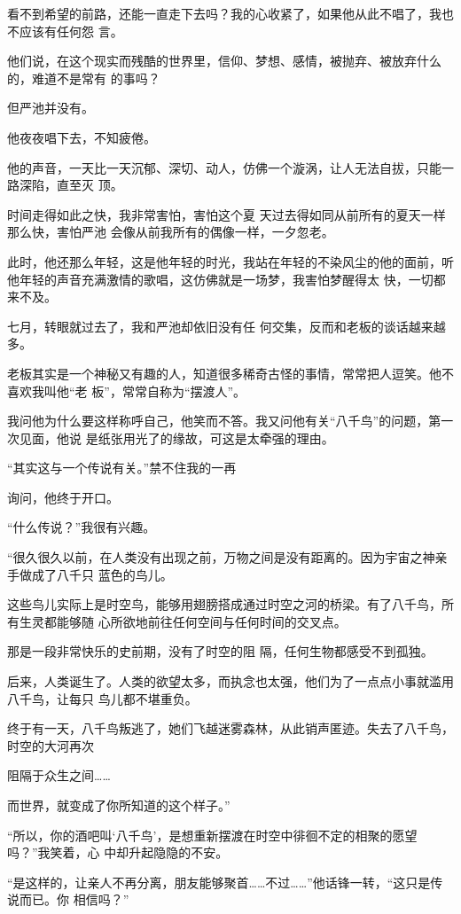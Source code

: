 \documentclass{article}
\begin{document}
看不到希望的前路，还能一直走下去吗？我的心收紧了，如果他从此不唱了，我也不应该有任何怨
言。 

他们说，在这个现实而残酷的世界里，信仰、梦想、感情，被抛弃、被放弃什么的，难道不是常有
的事吗？ 


但严池并没有。 


他夜夜唱下去，不知疲倦。 

他的声音，一天比一天沉郁、深切、动人，仿佛一个漩涡，让人无法自拔，只能一路深陷，直至灭
顶。 

时间走得如此之快，我非常害怕，害怕这个夏
\newpage
天过去得如同从前所有的夏天一样那么快，害怕严池
会像从前我所有的偶像一样，一夕忽老。 

此时，他还那么年轻，这是他年轻的时光，我站在年轻的不染风尘的他的面前，听他年轻的声音充满激情的歌唱，这仿佛就是一场梦，我害怕梦醒得太
快，一切都来不及。 

七月，转眼就过去了，我和严池却依旧没有任
何交集，反而和老板的谈话越来越多。 

老板其实是一个神秘又有趣的人，知道很多稀奇古怪的事情，常常把人逗笑。他不喜欢我叫他“老
板”，常常自称为“摆渡人”。 

我问他为什么要这样称呼自己，他笑而不答。我又问他有关“八千鸟”的问题，第一次见面，他说
是纸张用光了的缘故，可这是太牵强的理由。 

“其实这与一个传说有关。”禁不住我的一再

\newpage
询问，他终于开口。 


“什么传说？”我很有兴趣。 

“很久很久以前，在人类没有出现之前，万物之间是没有距离的。因为宇宙之神亲手做成了八千只
蓝色的鸟儿。 

这些鸟儿实际上是时空鸟，能够用翅膀搭成通过时空之河的桥梁。有了八千鸟，所有生灵都能够随
心所欲地前往任何空间与任何时间的交叉点。 

那是一段非常快乐的史前期，没有了时空的阻
隔，任何生物都感受不到孤独。 

后来，人类诞生了。人类的欲望太多，而执念也太强，他们为了一点点小事就滥用八千鸟，让每只
鸟儿都不堪重负。 

终于有一天，八千鸟叛逃了，她们飞越迷雾森林，从此销声匿迹。失去了八千鸟，时空的大河再次

\newpage
阻隔于众生之间…… 


而世界，就变成了你所知道的这个样子。” 

“所以，你的酒吧叫‘八千鸟’，是想重新摆渡在时空中徘徊不定的相聚的愿望吗？”我笑着，心
中却升起隐隐的不安。 

“是这样的，让亲人不再分离，朋友能够聚首……不过……”他话锋一转，“这只是传说而已。你
相信吗？” 
\end{document}
